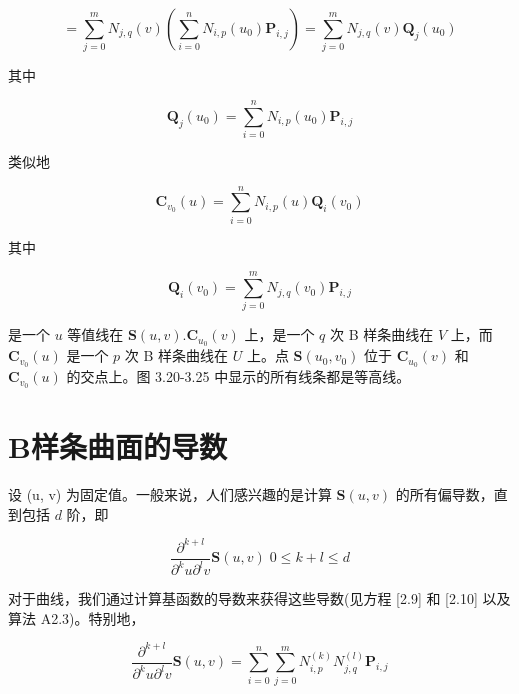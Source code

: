 \documentclass[../main.tex]{subfiles}
\begin{document}
\[
= \mathop{\sum }\limits_{{j = 0}}^{m}{N}_{j,q}\left( v\right) \left( {\mathop{\sum }\limits_{{i = 0}}^{n}{N}_{i,p}\left( {u}_{0}\right) {\mathbf{P}}_{i,j}}\right)  = \mathop{\sum }\limits_{{j = 0}}^{m}{N}_{j,q}\left( v\right) {\mathbf{Q}}_{j}\left( {u}_{0}\right)  \tag{3.14}
\]





其中

\[
{\mathbf{Q}}_{j}\left( {u}_{0}\right)  = \mathop{\sum }\limits_{{i = 0}}^{n}{N}_{i,p}\left( {u}_{0}\right) {\mathbf{P}}_{i,j}
\]

类似地

\[
{\mathbf{C}}_{{v}_{0}}\left( u\right)  = \mathop{\sum }\limits_{{i = 0}}^{n}{N}_{i,p}\left( u\right) {\mathbf{Q}}_{i}\left( {v}_{0}\right)
\]

其中

\[
{\mathbf{Q}}_{i}\left( {v}_{0}\right)  = \mathop{\sum }\limits_{{j = 0}}^{m}{N}_{j,q}\left( {v}_{0}\right) {\mathbf{P}}_{i,j} \tag{3.15}
\]

是一个 \(u\) 等值线在 \(\mathbf{S}\left( {u,v}\right) .{\mathbf{C}}_{{u}_{0}}\left( v\right)\) 上，是一个 \(q\) 次 B 样条曲线在 \(V\) 上，而 \({\mathbf{C}}_{{v}_{0}}\left( u\right)\) 是一个 \(p\) 次 B 样条曲线在 \(U\) 上。点 \(\mathbf{S}\left( {{u}_{0},{v}_{0}}\right)\) 位于 \({\mathbf{C}}_{{u}_{0}}\left( v\right)\) 和 \({\mathbf{C}}_{{v}_{0}}\left( u\right)\) 的交点上。图 3.20-3.25 中显示的所有线条都是等高线。



\section{B样条曲面的导数}

设 (u, v) 为固定值。一般来说，人们感兴趣的是计算 \(\mathbf{S}\left( {u,v}\right)\) 的所有偏导数，直到包括 \(d\) 阶，即

\[
\frac{{\partial }^{k + l}}{{\partial }^{k}u{\partial }^{l}v}\mathbf{S}\left( {u,v}\right) \;0 \leq  k + l \leq  d \tag{3.16}
\]

对于曲线，我们通过计算基函数的导数来获得这些导数(见方程 [2.9] 和 [2.10] 以及算法 A2.3)。特别地，

\[
\frac{{\partial }^{k + l}}{{\partial }^{k}u{\partial }^{l}v}\mathbf{S}\left( {u,v}\right)  = \mathop{\sum }\limits_{{i = 0}}^{n}\mathop{\sum }\limits_{{j = 0}}^{m}{N}_{i,p}^{\left( k\right) }{N}_{j,q}^{\left( l\right) }{\mathbf{P}}_{i,j} \tag{3.17}
\]
\end{document}
